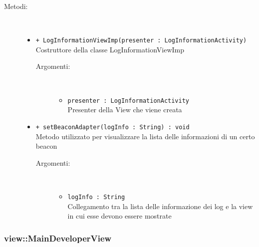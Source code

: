 \documentclass[../DefinizioneDiProdotto.tex]{subfiles}
\begin{document}
\begin{description}
\begin{itemize}
\end{itemize}
\item[Metodi:] \
\begin{itemize}
\item \texttt{+ LogInformationViewImp(presenter : LogInformationActivity)}\\
Costruttore della classe LogInformationViewImp
 \begin{description}
\item[Argomenti:] \
\begin{itemize}
\item \texttt{presenter : LogInformationActivity}\\
Presenter della View che viene creata\end{itemize}
\end{description}
\item \texttt{+ setBeaconAdapter(logInfo : String) : void}\\
Metodo utilizzato per visualizzare la lista delle informazioni di un certo beacon
 \begin{description}
\item[Argomenti:] \
\begin{itemize}
\item \texttt{logInfo : String}\\
Collegamento tra la lista delle informazione dei log e la view in cui esse devono essere mostrate\end{itemize}
\end{description}
\end{itemize}
\end{description}

\subsubsection{view::MainDeveloperView}
\end{document}

